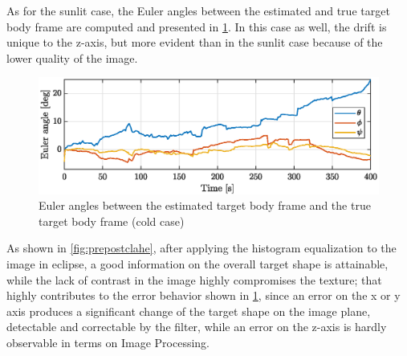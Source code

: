 As for the sunlit case, the Euler angles between the estimated and true target body frame are computed and presented in \cref{fig:anglesE}. In this case as well, the drift is unique to the z-axis, but more evident than in the sunlit case because of the lower quality of the image. \\

\begin{figure}[!h]
    \centering
    \includegraphics[width = \linewidth]{Images/eulangles_eclipse.eps}
    \caption[Euler angles between the true and estimated target body frame]{Euler angles between the estimated target body frame and the true target body frame (cold case)}
    \label{fig:anglesE}
\end{figure}
As shown in \cref{fig:prepostclahe}, after applying the histogram equalization to the image in eclipse, a good information on the overall target shape is attainable, while the lack of contrast in the image highly compromises the texture; that highly contributes to the error behavior shown in \cref{fig:anglesE}, since an error on the x or y axis produces a significant change of the target shape on the image plane, detectable and correctable by the filter, while an error on the z-axis is hardly observable in terms on Image Processing. 



